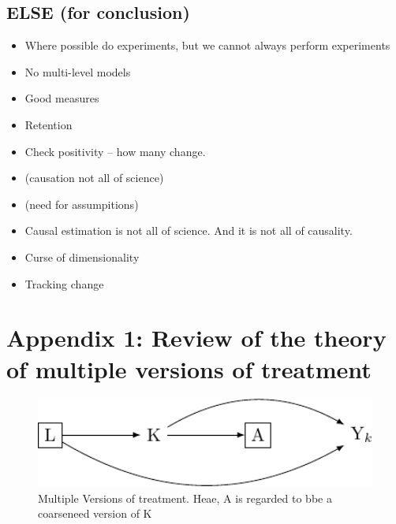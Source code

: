 \documentclass[
  singlecolumn]{report}
\providecommand{\tightlist}{%
  \setlength{\itemsep}{0pt}\setlength{\parskip}{0pt}}\usepackage{longtable,booktabs,array}
\begin{document}
\hypertarget{else-for-conclusion}{%
\subsection{ELSE (for conclusion)}\label{else-for-conclusion}}

\begin{itemize}
\tightlist
\item
  Where possible do experiments, but we cannot always perform
  experiments\\
\item
  No multi-level models
\item
  Good measures
\item
  Retention
\item
  Check positivity -- how many change.
\item
  (causation not all of science)
\item
  (need for assumpitions)
\item
  Causal estimation is not all of science. And it is not all of
  causality.
\item
  Curse of dimensionality
\item
  Tracking change
\end{itemize}

\hypertarget{appendix-1-review-of-the-theory-of-multiple-versions-of-treatment}{%
\section{Appendix 1: Review of the theory of multiple versions of
treatment}\label{appendix-1-review-of-the-theory-of-multiple-versions-of-treatment}}

\begin{figure}

{\centering \includegraphics[width=1\textwidth,height=\textheight]{causal-dags_files/figure-pdf/fig_dag_multiple_version_treatment_dag-1.pdf}

}

\caption{Multiple Versions of treatment. Heae, A is regarded to bbe a
coarseneed version of K}

\end{figure}
\end{document}
